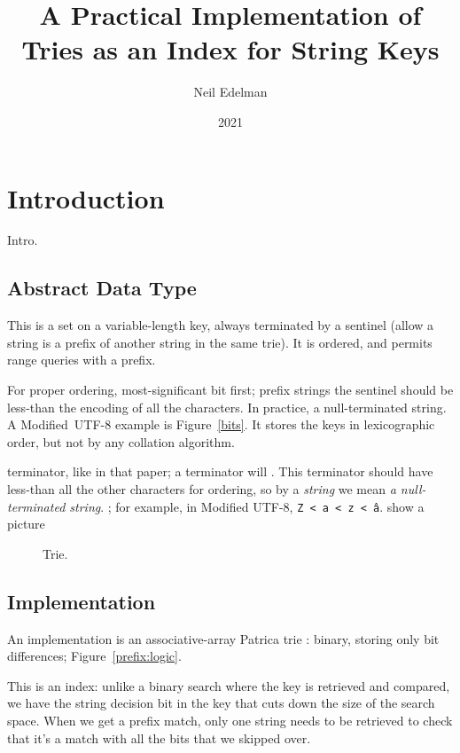 \documentclass{article}
\author{Neil Edelman}
\title{A Practical Implementation of Tries as an Index for String Keys}
\date{2021}
\newcommand{\code}[1]{\colorbox{light-gray}{\texttt{#1}}}
\begin{document}
\maketitle


\section{Introduction}

\noindent
Intro.\cite{morrison1968patricia}\cite{fredkin1960trie}\cite{knuth1997sorting}

\subsection{Abstract Data Type}

This is a set on a variable-length key, always terminated by a sentinel (allow a string is a prefix of another string in the same trie). It is ordered, and permits range queries with a prefix.

For proper ordering, most-significant bit first; prefix strings the sentinel should be less-than the encoding of all the characters. In practice, a null-terminated string. A Modified~UTF-8 example is Figure~\ref{bits}. It stores the keys in lexicographic order, but not by any collation algorithm.

terminator, like in that paper; a terminator will . This terminator should have less-than all the other characters for ordering, so by a \emph{string} we mean \emph{a null-terminated string}. ; for example, in Modified UTF-8, \code{Z < a < z < â}. show a picture

\begin{figure} %
	\centering
	\caption{Trie.\label{trie}}
\end{figure}

\subsection{Implementation}

An implementation is an associative-array Patrica trie \cite{}: binary, storing only bit differences; Figure~\ref{prefix:logic}.

This is an index: unlike a binary search where the key is retrieved and compared, we have the string decision bit in the key that cuts down the size of the search space. When we get a prefix match, only one string needs to be retrieved to check that it's a match with all the bits that we skipped over.
\end{document}
